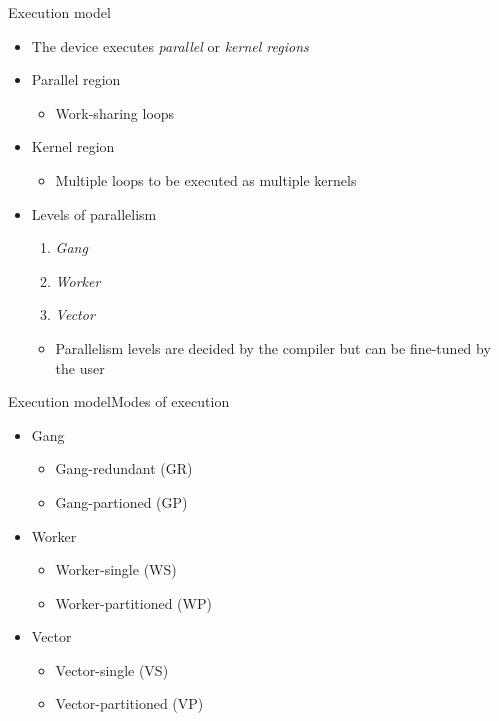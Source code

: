 \documentclass[12pt,aspectratio=169]{beamer}
\begin{document}
\begin{frame}{Execution model}
  \begin{itemize}
  \item The device executes \emph{parallel} or \emph{kernel regions}
  \item Parallel region
    \begin{itemize}
    \item Work-sharing loops
    \end{itemize}
  \item Kernel region
    \begin{itemize}
    \item Multiple loops to be executed as multiple kernels
    \end{itemize}
  \item Levels of parallelism
    \begin{enumerate}
    \item \emph{Gang} 
    \item \emph{Worker} 
    \item \emph{Vector} 
    \end{enumerate}
    \begin{itemize}
    \item Parallelism levels are decided by the compiler but can be fine-tuned by
      the user
    \end{itemize}
  \end{itemize}
\end{frame}

\begin{frame}{Execution model}{Modes of execution}
  \begin{itemize}
  \item Gang
    \begin{itemize}
    \item Gang-redundant (GR)
    \item Gang-partioned (GP)
    \end{itemize}
  \item Worker
    \begin{itemize}
    \item Worker-single (WS)
    \item Worker-partitioned (WP)
    \end{itemize}
  \item Vector
    \begin{itemize}
    \item Vector-single (VS)
    \item Vector-partitioned (VP)
    \end{itemize}
  \end{itemize}
\end{frame}
\end{document}
